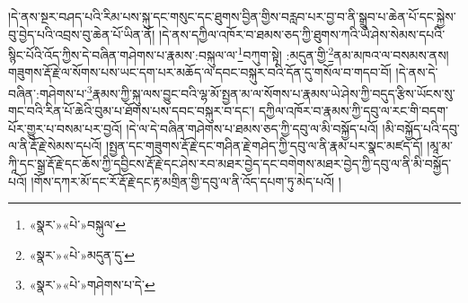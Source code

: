 །དེ་ནས་སྔར་བཤད་པའི་རིམ་པས་སྐུ་དང་གསུང་དང་ཐུགས་བྱིན་གྱིས་བརླབ་པར་བྱ་བ་ནི་སྒྲུབ་པ་ཆེན་པོ་དང་སྐྱེས་བུ་བྱེད་པའི་འབྲས་བུ་ཆེན་པོ་ཡིན་ནོ། །དེ་ནས་དཀྱིལ་འཁོར་བ་ཐམས་ཅད་ཀྱི་ཐུགས་ཀའི་ཡེ་ཤེས་སེམས་དཔའི་སྙིང་པོའི་འོད་ཀྱིས་དེ་བཞིན་གཤེགས་པ་རྣམས་:བསྐུལ་ལ་\footnote{«སྣར་»«པེ་»བསྐུལ་}བཀུག་སྟེ། :མདུན་གྱི་\footnote{«སྣར་»«པེ་»མདུན་དུ་}ནམ་མཁའ་ལ་བསམས་ནས། གཟུགས་རྡོ་རྗེ་ལ་སོགས་པས་ཡང་དག་པར་མཆོད་ལ་དབང་བསྐུར་བའི་དོན་དུ་གསོལ་བ་གདབ་བོ། །དེ་ནས་དེ་བཞིན་:གཤེགས་པ་\footnote{«སྣར་»«པེ་»གཤེགས་པ་དེ་}རྣམས་ཀྱི་སྐུ་ལས་བྱུང་བའི་ལྷ་མོ་སྤྱན་མ་ལ་སོགས་པ་རྣམས་ཡེ་ཤེས་ཀྱི་བདུད་རྩིས་ཡོངས་སུ་གང་བའི་རིན་པོ་ཆེའི་བུམ་པ་ཐོགས་པས་དབང་བསྐུར་བ་དང་། དཀྱིལ་འཁོར་བ་རྣམས་ཀྱི་དབུ་ལ་རང་གི་བདག་པོར་གྱུར་པ་བསམ་པར་བྱའོ། །དེ་ལ་དེ་བཞིན་གཤེགས་པ་ཐམས་ཅད་ཀྱི་དབུ་ལ་མི་བསྐྱོད་པའོ། །མི་བསྐྱོད་པའི་དབུ་ལ་ནི་རྡོ་རྗེ་སེམས་དཔའོ། །སྤྱན་དང་གཟུགས་རྡོ་རྗེ་དང་གཤིན་རྗེ་གཤེད་ཀྱི་དབུ་ལ་ནི་རྣམ་པར་སྣང་མཛད་དོ། །མཱ་མ་ཀཱི་དང་སྒྲ་རྡོ་རྗེ་དང་ཆོས་ཀྱི་དབྱིངས་རྡོ་རྗེ་དང་ཤེས་རབ་མཐར་བྱེད་དང་བགེགས་མཐར་བྱེད་ཀྱི་དབུ་ལ་ནི་མི་བསྐྱོད་པའོ། །གོས་དཀར་མོ་དང་རོ་རྡོ་རྗེ་དང་རྟ་མགྲིན་གྱི་དབུ་ལ་ནི་འོད་དཔག་ཏུ་མེད་པའོ། །
